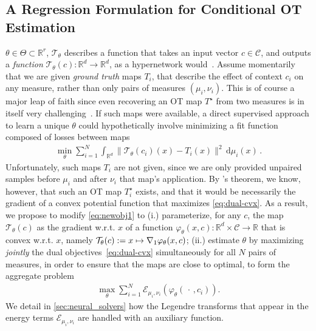 \subsection{A Regression Formulation for Conditional OT Estimation}
 $\theta\in\Theta\subset\mathbb{R}^r$, $\mathcal{T}_\theta$ describes a function that takes an input vector $c\in\mathcal{C}$, and outputs a \textit{function} $\mathcal{T}_\theta(c):\mathbb{R}^d\rightarrow\mathbb{R}^d$, as a hypernetwork would~\citep{ha2016hypernetworks}. Assume momentarily that we are given \textit{ground truth} maps $T_i$, that describe the effect of context $c_i$ on any measure, rather than only pairs of measures $(\mu_i,\nu_i)$. This is of course a major leap of faith since even recovering an \acrshort{OT} map $T^\star$ from two measures is in itself very challenging~\citep{hutter2021minimax,rigollet2022sample,pooladian2021entropic}. If such maps were available, a direct supervised approach to learn a unique $\theta$ could hypothetically involve minimizing a fit function composed of losses between maps
\begin{align}\label{eq:newobj1}
\min_\theta \sum_{i=1}^N \int_{\mathbb{R}^d} \|\mathcal{T}_{\theta}(c_i)(x) - T_i(x)\|^2\, \mathrm{d}\mu_i(x)\,.
\end{align}
Unfortunately, such maps $T_i$ are not given, since we are only provided unpaired samples before $\mu_i$ and after $\nu_i$ that map's application.
By \citeauthor{brenier1987decomposition}'s theorem, we know, however, that such an \acrshort{OT} map $T^\star_i$ exists, and that it would be necessarily the gradient of a convex potential function that maximizes \eqref{eq:dual-cvx}. As a result, we propose to modify \eqref{eq:newobj1} to (i.) parameterize, for any $c$, the map $\mathcal{T}_\theta(c)$ as the gradient w.r.t. $x$ of a function $\varphi_\theta(x,c):\mathbb{R}^d\times \mathcal{C}\rightarrow \mathbb{R}$ that is convex w.r.t. $x$, namely $\mathcal{T}_\theta(c) := x \mapsto \nabla_1 \varphi_\theta(x,c)$; (ii.) estimate $\theta$ by maximizing \textit{jointly} the dual objectives~\eqref{eq:dual-cvx} simultaneously for all $N$ pairs of measures, in order to ensure that the maps are close to optimal, to form the aggregate problem
\begin{align}\label{eq:supdual} 
\textstyle \max_\theta \sum_{i=1}^N \mathcal{E}_{\mu_i,\nu_i}(\varphi_{\theta}(\,\cdot\,, c_i)).
\end{align}
We detail in \cref{sec:neural_solvers} how the Legendre transforms that appear in the energy terms $\mathcal{E}_{\mu_i,\nu_i}$ are handled with an auxiliary function.

